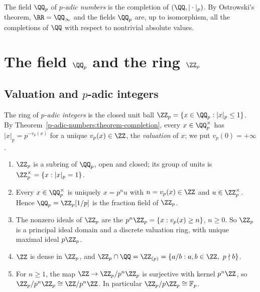 \begin{definition}\label{p-adic-numbers:definition-q-p}
The field $\QQ_p$ of \emph{$p$-adic numbers} is the completion of $(\QQ, |\cdot|_p)$. By Ostrowski's theorem, $\RR = \QQ_\infty$ and the fields $\QQ_p$ are, up to isomorphism, all the completions of $\QQ$
with respect to nontrivial absolute values.
\end{definition}

\section{The field $\QQ_p$ and the ring $\ZZ_p$}\label{p-adic-numbers:section-q-p}

\subsection{Valuation and $p$-adic integers}\label{p-adic-numbers:subsection-z-p}

\begin{definition}\label{p-adic-numbers:definition-z-p}
The ring of \emph{$p$-adic integers} is the closed unit ball $\ZZ_p = \{x \in \QQ_p : |x|_p \leq 1\}$. By Theorem~\ref{p-adic-numbers:theorem-completion}, every $x \in \QQ_p^\times$ has
$|x|_p = p^{-v_p(x)}$ for a unique $v_p(x) \in \ZZ$, the \emph{valuation} of $x$; we put $v_p(0) = +\infty$.
\end{definition}

\begin{proposition}\label{p-adic-numbers:proposition-z-p}
\begin{enumerate}
\item $\ZZ_p$ is a subring of $\QQ_p$, open and closed; its group of units is $\ZZ_p^\times = \{x : |x|_p = 1\}$.
\item Every $x \in \QQ_p^\times$ is uniquely $x = p^nu$ with $n = v_p(x) \in \ZZ$ and $u \in \ZZ_p^\times$. Hence $\QQ_p = \ZZ_p[1/p]$ is the fraction field of $\ZZ_p$.
\item The nonzero ideals of $\ZZ_p$ are the $p^n\ZZ_p = \{x : v_p(x) \geq n\}$, $n \geq 0$. So $\ZZ_p$ is a principal ideal domain and a discrete valuation ring, with unique maximal ideal $p\ZZ_p$.
\item $\ZZ$ is dense in $\ZZ_p$, and $\ZZ_p \cap \QQ = \ZZ_{(p)} = \{a/b : a, b \in \ZZ, \ p \nmid b\}$.
\item For $n \geq 1$, the map $\ZZ \to \ZZ_p/p^n\ZZ_p$ is surjective with kernel $p^n\ZZ$, so $\ZZ_p/p^n\ZZ_p \cong \ZZ/p^n\ZZ$. In particular $\ZZ_p/p\ZZ_p \cong \mathbb{F}_p$.
\end{enumerate}
\end{proposition}

